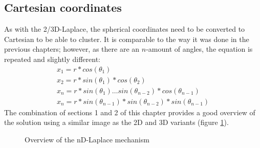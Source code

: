 \subsection{Cartesian coordinates}
As with the 2/3D-Laplace, the spherical coordinates need to be converted to Cartesian to be able to cluster.
It is comparable to the way it was done in the previous chapters; however, as there are an $n$-amount of angles, the equation is repeated and slightly different:
\begin{align}
  x_1 = r * cos (\theta_1)                                          \\
  x_2 = r * sin (\theta_1) * cos (\theta_2)                         \\
  x_{n} = r * sin(\theta_1) … sin(\theta_{n-2}) *cos (\theta_{n-1}) \\
  x_n = r * sin(\theta_{n-1}) * sin(\theta_{n-2}) * sin(\theta_{n-1})
  \label{eq:nd-laplace-cartesian}
\end{align}
The combination of sections 1 and 2 of this chapter provides a good overview of the solution using a similar image as the 2D and 3D variants (figure \ref{fig:nd-laplace-overview}).
\begin{figure}[H]
  
  \caption{Overview of the nD-Laplace mechanism}
  \label{fig:nd-laplace-overview}
\end{figure}
